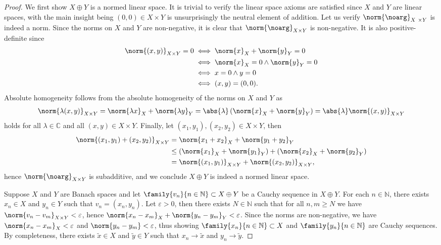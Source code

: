 \begin{proof}
    We first show \(X \oplus Y\) is a normed linear space. It is trivial to verify the linear space axioms are satisfied since \(X\) and \(Y\) are linear spaces, with the main insight being \((0,0) \in X\times Y\) is unsurprisingly the neutral element of addition. Let us verify \(\norm{\noarg}_{X\ \times Y}\) is indeed a norm. Since the norms on \(X\) and \(Y\) are non-negative, it is clear that \(\norm{\noarg}_{X\times Y}\) is non-negative. It is also positive-definite since
    \begin{align*}
        \norm{(x, y)}_{X \times Y} = 0 &\iff \norm{x}_X + \norm{y}_{Y} = 0\\
                                       &\iff \norm{x}_X = 0 \land \norm{y}_Y = 0\\
                                       &\iff x = 0 \land y = 0\\
                                       &\iff (x,y) = (0,0).
    \end{align*}
    Absolute homogeneity follows from the absolute homogeneity of the norms on \(X\) and \(Y\) as
    \begin{align*}
        \norm{\lambda (x, y)}_{X \times Y} = \norm{\lambda x}_X + \norm{\lambda y}_Y = \abs{\lambda} \left(\norm{x}_X + \norm{y}_Y\right) = \abs{\lambda} \norm{(x,y)}_{X \times Y}
    \end{align*}
    holds for all \(\lambda \in \mathbb{C}\) and all \((x,y) \in X \times Y\). Finally, let \((x_1, y_1), (x_2, y_2) \in X\times Y\), then
    \begin{align*}
        \norm{(x_1, y_1) + (x_2, y_2)}_{X \times Y} &= \norm{x_1 + x_2}_X + \norm{y_1 + y_2}_Y\\ &\leq \left(\norm{x_1}_X + \norm{y_1}_Y\right) + \left(\norm{x_2}_X + \norm{y_2}_Y\right) \\&= \norm{(x_1, y_1)}_{X \times Y} + \norm{(x_2, y_2)}_{X\times Y},
    \end{align*}
    hence \(\norm{\noarg}_{X\times Y}\) is subadditive, and we conclude \(X \oplus Y\) is indeed a normed linear space.

    Suppose \(X\) and \(Y\) are Banach spaces and let \(\family{v_n}{n \in \mathbb{N}} \subset X \oplus Y\) be a Cauchy sequence in \(X \oplus Y\). For each \(n \in \mathbb{N}\), there exists \(x_n \in X\) and \(y_n \in Y\) such that \(v_n = (x_n, y_n)\). Let \(\varepsilon > 0\), then there exists \(N \in \mathbb{N}\) such that for all \(n, m \geq N\) we have \(\norm{v_n - v_m}_{X \times Y} < \varepsilon\), hence \(\norm{x_n - x_m}_X + \norm{y_n - y_m}_Y < \varepsilon\). Since the norms are non-negative, we have \(\norm{x_n - x_m}_X < \varepsilon\) and \(\norm{y_n - y_m} < \varepsilon\), thus showing \(\family{x_n}{n \in \mathbb{N}} \subset X\) and \(\family{y_n}{n \in \mathbb{N}}\) are Cauchy sequences. By completeness, there exists \(\tilde{x} \in X\) and \(\tilde{y} \in Y\) such that \(x_n \to \tilde{x}\) and \(y_n \to \tilde{y}\).


\end{proof}
